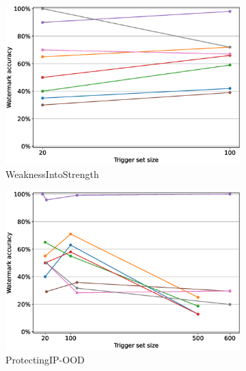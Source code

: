 \begin{figure}
    \centering
    \begin{subfigure}{0.41\linewidth}
        \includegraphics[width=\linewidth]{images/finetuning/WeaknessIntoStrength_finetuning_per_method_smalllr.eps}
        \caption{WeaknessIntoStrength}
        \label{fig:finetuning-smalllr-permethod-weakness}
    \end{subfigure}
    \quad
    \begin{subfigure}{0.41\linewidth}
        \includegraphics[width=\linewidth]{images/finetuning/ProtectingIP-OOD_finetuning_per_method_smalllr.eps}
        \caption{ProtectingIP-OOD}
        \label{fig:finetuning-smalllr-permethod-ood}
    \end{subfigure}
    \quad
    \begin{subfigure}{0.41\linewidth}

\end{subfigure}
\end{figure}
